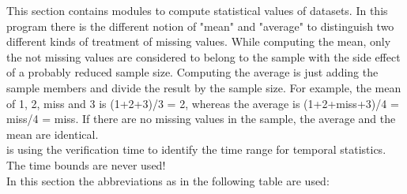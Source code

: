 This section contains modules to compute statistical values of datasets.
In this program there is the different notion of "mean" and "average"
to distinguish two different kinds of treatment of missing values.
While computing the mean, only the not missing values are considered
to belong to the sample with the side effect of a probably reduced sample
size. Computing the average is just adding the sample members and divide
the result by the sample size. For example, the mean of 1, 2, miss and 3
is (1+2+3)/3 = 2, whereas the average is (1+2+miss+3)/4 = miss/4 = miss.
If there are no missing values in the sample, the average and the mean are identical.\\
{\CDO} is using the verification time to identify the time range
for temporal statistics. The time bounds are never used! \\

In this section the abbreviations as in the following table are used:

\vspace{3mm}

